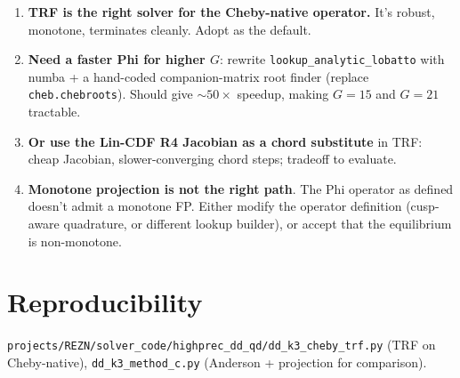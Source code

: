\documentclass[11pt]{article}
\begin{document}
\begin{enumerate}
  \item \textbf{TRF is the right solver for the Cheby-native operator.}
        It's robust, monotone, terminates cleanly. Adopt as the default.
  \item \textbf{Need a faster Phi for higher $G$}: rewrite \texttt{lookup\_analytic\_lobatto}
        with numba + a hand-coded companion-matrix root finder (replace
        \texttt{cheb.chebroots}). Should give $\sim 50\times$ speedup,
        making $G=15$ and $G=21$ tractable.
  \item \textbf{Or use the Lin-CDF R4 Jacobian as a chord substitute} in TRF:
        cheap Jacobian, slower-converging chord steps; tradeoff to evaluate.
  \item \textbf{Monotone projection is not the right path}. The Phi
        operator as defined doesn't admit a monotone FP. Either modify the
        operator definition (cusp-aware quadrature, or different lookup
        builder), or accept that the equilibrium is non-monotone.
\end{enumerate}

\section{Reproducibility}

\texttt{projects/REZN/solver\_code/highprec\_dd\_qd/dd\_k3\_cheby\_trf.py}
(TRF on Cheby-native), \texttt{dd\_k3\_method\_c.py} (Anderson + projection
for comparison).
\end{document}
